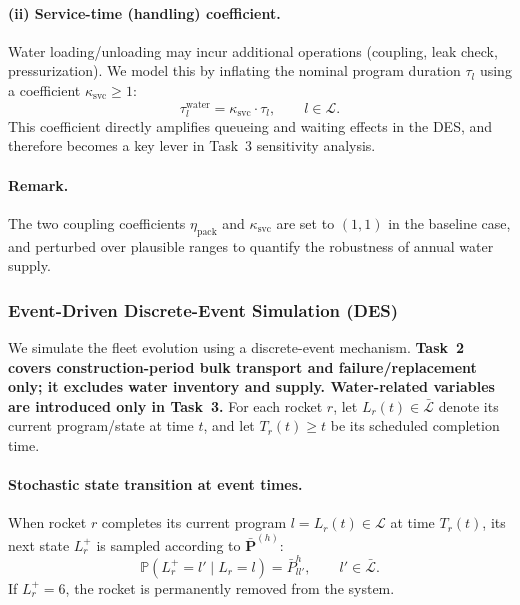 ﻿\documentclass{mcmthesis}
\begin{document}
\paragraph{(ii) Service-time (handling) coefficient.}
Water loading/unloading may incur additional operations (coupling, leak check, pressurization).
We model this by inflating the nominal program duration $\tau_l$ using a coefficient
$\kappa_{\text{svc}}\ge 1$:
\begin{equation}
\tau_{l}^{\text{water}}=\kappa_{\text{svc}}\cdot \tau_l,\qquad l\in\mathcal{L}.
\end{equation}
This coefficient directly amplifies queueing and waiting effects in the DES, and therefore becomes a
key lever in Task~3 sensitivity analysis.

\paragraph{Remark.}
The two coupling coefficients $\eta_{\text{pack}}$ and $\kappa_{\text{svc}}$ are set to $(1,1)$ in the baseline case,
and perturbed over plausible ranges to quantify the robustness of annual water supply.

\subsubsection{Event-Driven Discrete-Event Simulation (DES)}
\label{sec:model2_des}

We simulate the fleet evolution using a discrete-event mechanism. \textbf{Task~2 covers construction-period bulk transport and failure/replacement only; it excludes water inventory and supply. Water-related variables are introduced only in Task~3.}
For each rocket $r$, let $L_r(t)\in\bar{\mathcal{L}}$ denote its current program/state at time $t$,
and let $T_r(t)\ge t$ be its scheduled completion time.

\paragraph{Stochastic state transition at event times.}
When rocket $r$ completes its current program $l=L_r(t)\in\mathcal{L}$ at time $T_r(t)$,
its next state $L_r^{+}$ is sampled according to $\bar{\mathbf P}^{(h)}$:
\[
\mathbb{P}(L_r^{+}=l' \mid L_r=l)=\bar P^{h}_{ll'}, \qquad l'\in\bar{\mathcal{L}}.
\]
If $L_r^{+}=6$, the rocket is permanently removed from the system.
\end{document}
